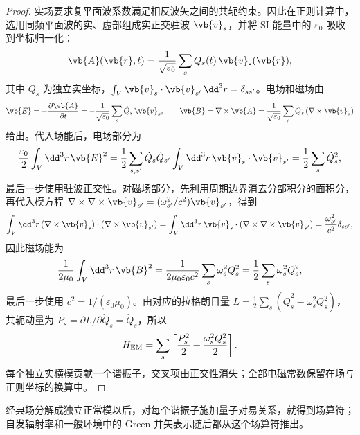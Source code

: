 \begin{proof}
实场要求复平面波系数满足相反波矢之间的共轭约束。因此在正则计算中，选用同频平面波的实、虚部组成实正交驻波 $\vb{v}_s$，并将 SI 能量中的 $\varepsilon_0$ 吸收到坐标归一化：
\begin{equation*}
\vb{A}(\vb{r},t)
=\frac1{\sqrt{\varepsilon_0}}\sum_s
Q_s(t)\,\vb{v}_s(\vb{r}),
\end{equation*}
其中 $Q_s$ 为独立实坐标，$\int_V\vb{v}_s\cdot\vb{v}_{s'}\,\dd^3r=\delta_{ss'}$。电场和磁场由
\begin{equation*}
\vb{E}=-\frac{\partial\vb{A}}{\partial t}
=-\frac1{\sqrt{\varepsilon_0}}\sum_s\dot Q_s\,\vb{v}_s,
\qquad
\vb{B}=\nabla\times\vb{A}
=\frac1{\sqrt{\varepsilon_0}}\sum_sQ_s\,(\nabla\times\vb{v}_s)
\end{equation*}
给出。代入场能后，电场部分为
\begin{equation*}
\frac{\varepsilon_0}{2}\int_V\dd^3 r\,\vb{E}^2
=\frac12\sum_{s,s'}\dot Q_s\dot Q_{s'}
\int_V\dd^3r\,\vb{v}_s\cdot\vb{v}_{s'}
=\frac12\sum_s\dot Q_s^2,
\end{equation*}
最后一步使用驻波正交性。对磁场部分，先利用周期边界消去分部积分的面积分，再代入模方程 $\nabla\times\nabla\times\vb{v}_{s'}=(\omega_{s'}^2/c^2)\vb{v}_{s'}$，得到
\begin{equation*}
\int_V\dd^3r\,(\nabla\times\vb{v}_s)\cdot(\nabla\times\vb{v}_{s'})
=\int_V\dd^3r\,\vb{v}_s\cdot(\nabla\times\nabla\times\vb{v}_{s'})
=\frac{\omega_{s'}^2}{c^2}\delta_{ss'},
\end{equation*}
因此磁场能为
\begin{equation*}
\frac{1}{2\mu_0}\int_V\dd^3r\,\vb{B}^2
=\frac1{2\mu_0\varepsilon_0c^2}\sum_s\omega_s^2Q_s^2
=\frac12\sum_s\omega_s^2Q_s^2,
\end{equation*}
最后一步使用 $c^2=1/(\varepsilon_0\mu_0)$。由对应的拉格朗日量 $L=\tfrac12\sum_s(\dot Q_s^2-\omega_s^2Q_s^2)$，共轭动量为 $P_s=\partial L/\partial\dot Q_s=\dot Q_s$，所以
\begin{equation*}
H_{\rm EM}=\sum_s\left[\frac{P_s^2}{2}+\frac{\omega_s^2Q_s^2}{2}\right].
\end{equation*}
每个独立实横模贡献一个谐振子，交叉项由正交性消失；全部电磁常数保留在场与正则坐标的换算中。
\end{proof}

经典场分解成独立正常模以后，对每个谐振子施加量子对易关系，就得到场算符；自发辐射率和一般环境中的 Green 并矢表示随后都从这个场算符推出。

